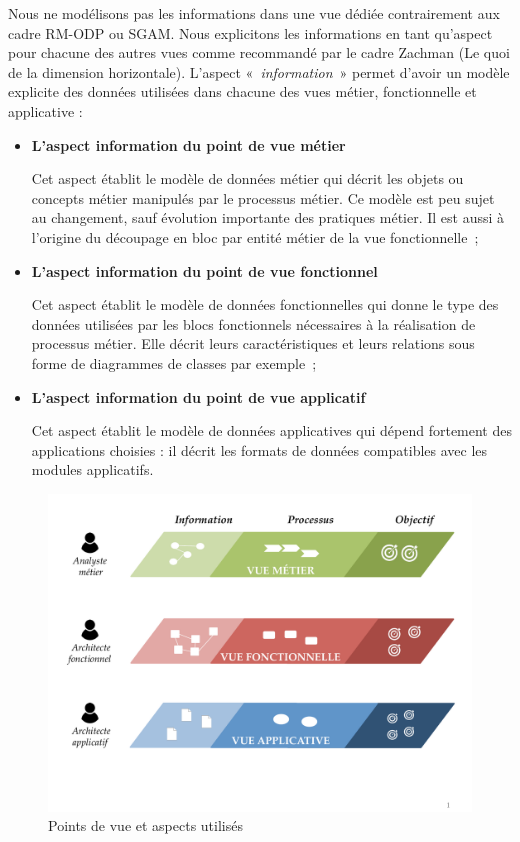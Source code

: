 Nous ne modélisons pas les informations dans une vue dédiée contrairement aux cadre RM-ODP ou SGAM. Nous explicitons les informations en tant qu'aspect pour chacune des autres vues comme recommandé par le cadre Zachman (Le quoi de la dimension horizontale). L'aspect «~\textit{information}~» permet d'avoir un modèle explicite des données utilisées dans chacune des vues métier, fonctionnelle et applicative :
	\begin{itemize}
	\item \textbf{L'aspect information du point de vue métier}
	
	Cet aspect établit le modèle de données métier qui  décrit les objets ou concepts métier manipulés par le processus métier. Ce modèle est peu sujet au changement, sauf évolution importante des pratiques métier. Il est aussi à l'origine du découpage en bloc par entité métier de la vue fonctionnelle~;
	\item \textbf{L'aspect information du point de vue fonctionnel}
	
	Cet aspect établit le modèle de données fonctionnelles qui donne le type des données utilisées par les blocs fonctionnels nécessaires à la réalisation de processus métier. Elle décrit leurs caractéristiques et leurs relations sous forme de diagrammes de classes par exemple~;
	
	\item \textbf{L'aspect information du point de vue applicatif} 
	
	Cet aspect établit le modèle de données applicatives qui dépend fortement des applications choisies : il décrit les formats de données compatibles avec les modules applicatifs.
	\end{itemize}
	
\begin{figure}[!ht]
 \begin{center}
  \includegraphics[trim= 0cm 3cm 0cm 0cm, width=1\textwidth]{figures/4_demarche/vue_aspect.pdf}
 \end{center}
 \caption{Points de vue et aspects utilisés}
 \label{fig:vue_aspect}
\end{figure}
	
